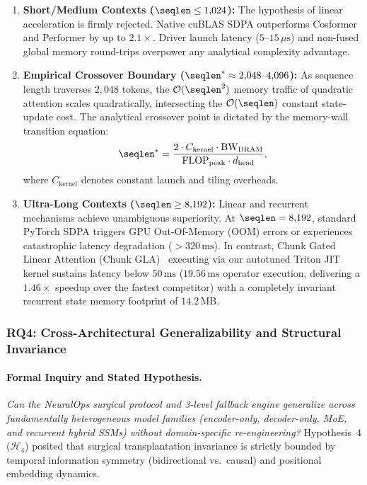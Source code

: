 \begin{enumerate}
    \item \textbf{Short/Medium Contexts ($\seqlen \le 1{,}024$):}
    The hypothesis of linear acceleration is firmly rejected.
    Native cuBLAS SDPA outperforms Cosformer and Performer by up to $2.1\times$.
    Driver launch latency ($5\text{--}15\,\mu\text{s}$) and non-fused global memory round-trips overpower any analytical complexity advantage.
    \item \textbf{Empirical Crossover Boundary ($\seqlen^* \approx 2{,}048\text{--}4{,}096$):}
    As sequence length traverses $2{,}048$ tokens, the $\mathcal{O}(\seqlen^2)$ memory traffic of quadratic attention scales quadratically, intersecting the $\mathcal{O}(\seqlen)$ constant state-update cost.
    The analytical crossover point is dictated by the memory-wall transition equation:
    \begin{equation}
        \seqlen^* = \frac{2 \cdot C_{\text{kernel}} \cdot \text{BW}_{\text{DRAM}}}{\text{FLOP}_{\text{peak}} \cdot d_{\text{head}}},
        \label{eq:crossover_analytic}
    \end{equation}
    where $C_{\text{kernel}}$ denotes constant launch and tiling overheads.
    \item \textbf{Ultra-Long Contexts ($\seqlen \ge 8{,}192$):}
    Linear and recurrent mechanisms achieve unambiguous superiority.
    At $\seqlen = 8{,}192$, standard PyTorch SDPA triggers GPU Out-Of-Memory (OOM) errors or experiences catastrophic latency degradation ($>320\,\text{ms}$).
    In contrast, Chunk Gated Linear Attention (Chunk GLA)~\cite{yang2024fla} executing via our autotuned Triton JIT kernel sustains latency below $50\,\text{ms}$ ($19.56\,\text{ms}$ operator execution, delivering a $1.46\times$ speedup over the fastest competitor) with a completely invariant recurrent state memory footprint of $14.2\,\text{MB}$.
\end{enumerate}

\subsubsection{RQ4: Cross-Architectural Generalizability and Structural Invariance}
\label{subsubsec:res_rq4}

\paragraph{Formal Inquiry and Stated Hypothesis.}
\emph{Can the NeuralOps surgical protocol and 3-level fallback engine generalize across fundamentally heterogeneous model families (encoder-only, decoder-only, MoE, and recurrent hybrid SSMs) without domain-specific re-engineering?}
Hypothesis~4 ($\mathcal{H}_4$) posited that surgical transplantation invariance is strictly bounded by temporal information symmetry (bidirectional vs.\ causal) and positional embedding dynamics.

